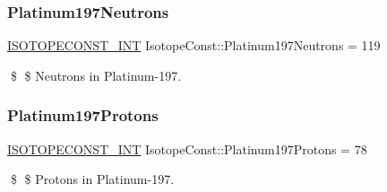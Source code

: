 \subsubsection{\texorpdfstring{Platinum197\+Neutrons}{Platinum197Neutrons}}
{\footnotesize\ttfamily \mbox{\hyperlink{group___isotope_const-_macros_ga5f18360b3e99483a35c32d789e62621c}{I\+S\+O\+T\+O\+P\+E\+C\+O\+N\+S\+T\+\_\+\+I\+NT}} Isotope\+Const\+::\+Platinum197\+Neutrons = 119}

\$ \$ Neutrons in Platinum-\/197. \mbox{\label{group___isotope_const-_platinum-_pt197_ga7e0300b3970c8181729180d4b0cc88a6}} 
\subsubsection{\texorpdfstring{Platinum197\+Protons}{Platinum197Protons}}
{\footnotesize\ttfamily \mbox{\hyperlink{group___isotope_const-_macros_ga5f18360b3e99483a35c32d789e62621c}{I\+S\+O\+T\+O\+P\+E\+C\+O\+N\+S\+T\+\_\+\+I\+NT}} Isotope\+Const\+::\+Platinum197\+Protons = 78}

\$ \$ Protons in Platinum-\/197. 